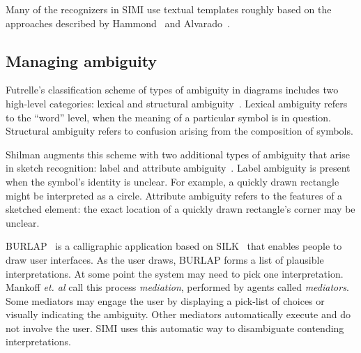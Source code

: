 Many of the recognizers in SIMI use textual templates roughly based on
the approaches described by Hammond~\cite{hammond-ladder} and
Alvarado~\cite[Chapter 4]{alvarado-phd-thesis}.

\subsection{Managing ambiguity}
\label{sec:recognition-managing-ambiguity}

Futrelle's classification scheme of types of ambiguity in diagrams
includes two high-level categories: lexical and structural
ambiguity~\cite{futrelle-ambigutiy}. Lexical ambiguity refers to the
``word'' level, when the meaning of a particular symbol is in
question. Structural ambiguity refers to confusion arising from the
composition of symbols.

Shilman augments this scheme with two additional types of ambiguity
that arise in sketch recognition: label and attribute
ambiguity~\cite{shilman-parsing}. Label ambiguity is present when the
symbol's identity is unclear. For example, a quickly drawn rectangle
might be interpreted as a circle. Attribute ambiguity refers to the
features of a sketched element: the exact location of a quickly drawn
rectangle's corner may be unclear.

BURLAP~\cite{mankoff-burlap} is a calligraphic application based on
SILK~\cite{landay-silk} that enables people to draw user
interfaces. As the user draws, BURLAP forms a list of plausible
interpretations. At some point the system may need to pick one
interpretation. Mankoff \textit{et. al} call this process
\textit{mediation}, performed by agents called
\textit{mediators}. Some mediators may engage the user by displaying a
pick-list of choices or visually indicating the ambiguity. Other
mediators automatically execute and do not involve the user. SIMI
uses this automatic way to disambiguate contending interpretations.

